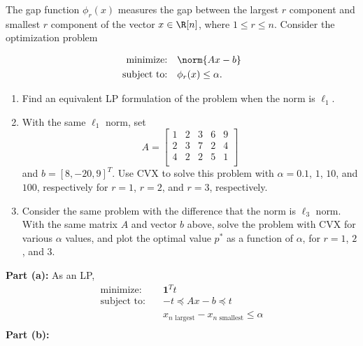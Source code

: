 \documentclass[11pt]{article}
\begin{document}
\begin{homeworkProblem}

    The gap function $\phi_r(x)$ measures the gap between the largest $r$ component and smallest $r$
    component of the vector $x \in \R[n]$, where $1 \leq r \leq n$. Consider the optimization problem

    \begin{align*}
        \text{minimize:} \quad   & \norm{Ax-b}            \\
        \text{subject to:} \quad & \phi_r(x) \leq \alpha.
    \end{align*}
    \begin{enumerate}[label=(\alph*), topsep=5pt, itemsep=5pt]
        \item Find an equivalent LP formulation of the problem when the norm is $\ell_1$.
        \item With the same $\ell_1$ norm, set
              \[
                  A = \begin{bmatrix}
                      1 & 2 & 3 & 6 & 9 \\
                      2 & 3 & 7 & 2 & 4 \\
                      4 & 2 & 2 & 5 & 1 \\
                  \end{bmatrix}
              \]
              and $b = [8, -20, 9]^T$. Use CVX to solve this problem with $\alpha =0.1$, $1$, $10$, and $100$, respectively for $r = 1$, $r = 2$, and $r = 3$, respectively.
        \item Consider the same problem with the difference that the norm is $\ell_3$ norm. With the same
              matrix $A$ and vector $b$ above, solve the problem with CVX for various $\alpha$ values, and plot
              the optimal value $p^*$ as a function of $\alpha$, for $r = 1$, $2$, and $3$. \newline
    \end{enumerate}

    \solution

    \textbf{Part (a):} As an LP,
    \begin{align*}
        \text{minimize:} \quad   & \mathbf{1}^T t                                           \\
        \text{subject to:} \quad & -t \preceq Ax - b \preceq t                              \\
                                 & x_{n\text{ largest}} - x_{n\text{ smallest}} \leq \alpha \\
    \end{align*}
    \textbf{Part (b):}


\end{homeworkProblem}
\end{document}
